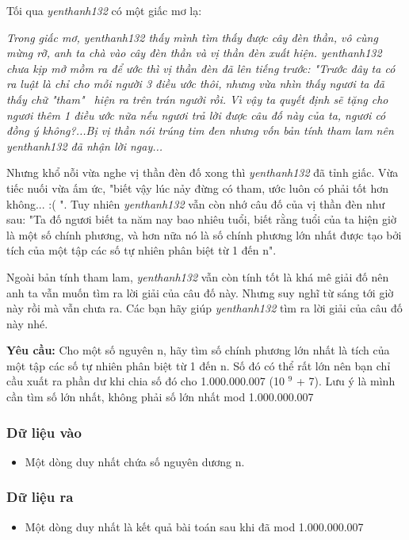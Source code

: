 



   Tối qua   \emph{    yenthanh132   }   có một giấc mơ lạ:  

\emph{    Trong giấc mơ, yenthanh132 thấy mình tìm thấy được cây đèn thần, vô cùng mừng rỡ, anh ta chà vào cây đèn thần và vị thần đèn xuất hiện. yenthanh132 chưa kịp mở mồm ra để ước thì vị thần đèn đã lên tiếng trước: "Trước đây ta có ra luật là chỉ cho mỗi người 3 điều ước thôi, nhưng vừa nhìn thấy ngươi ta đã thấy chữ "tham"  hiện ra trên trán ngưởi rồi. Vì vậy ta quyết định sẽ tặng cho ngươi thêm 1 điều ước nữa nếu ngươi trả lời được câu đố này của ta, ngươi có đồng ý không?...Bị vị thần nói trúng tim đen nhưng vốn bản tính tham lam nên yenthanh132 đã nhận lời ngay...   }

   Nhưng khổ nỗi vừa nghe vị thần đèn đố xong thì   \emph{    yenthanh132   }   đã tỉnh giấc. Vừa tiếc nuối vừa ấm ức, "biết vậy lúc nảy đừng có tham, ước luôn có phải tốt hơn không... :( ". Tuy nhiên   \emph{    yenthanh132   }   vẫn còn nhớ câu đố của vị thần đèn như sau: "Ta đố ngươi biết ta năm nay bao nhiêu tuổi, biết rằng tuổi của ta hiện giờ là một số chính phương, và hơn nữa nó là số chính phương lớn nhất được tạo bởi tích của một tập các số tự nhiên phân biệt từ 1 đến n".  

   Ngoài bản tính tham lam,   \emph{    yenthanh132   }   vẫn còn tính tốt là khá mê giải đố nên anh ta vẫn muốn tìm ra lời giải của câu đố này. Nhưng suy nghĩ từ sáng tới giờ này rồi mà vẫn chưa ra. Các bạn hãy giúp   \emph{    yenthanh132   }   tìm ra lời giải của câu đố này nhé.  

\textbf{    Yêu cầu:   }   Cho một số nguyên n, hãy tìm số chính phương lớn nhất là tích của một tập các số tự nhiên phân biệt từ 1 đến n. Số đó có thể rất lớn nên bạn chỉ cầu xuất ra phần dư khi chia số đó cho 1.000.000.007 (10   $^    9   $   + 7). Lưu ý là mình cần tìm số lớn nhất, không phải số lớn nhất mod 1.000.000.007  

\subsubsection{   Dữ liệu vào  }
\begin{itemize}
	\item     Một dòng duy nhất chứa số nguyên dương n.   
\end{itemize}

\subsubsection{   Dữ liệu ra  }
\begin{itemize}
	\item     Một dòng duy nhất là kết quả bài toán sau khi đã mod 1.000.000.007   
\end{itemize}

